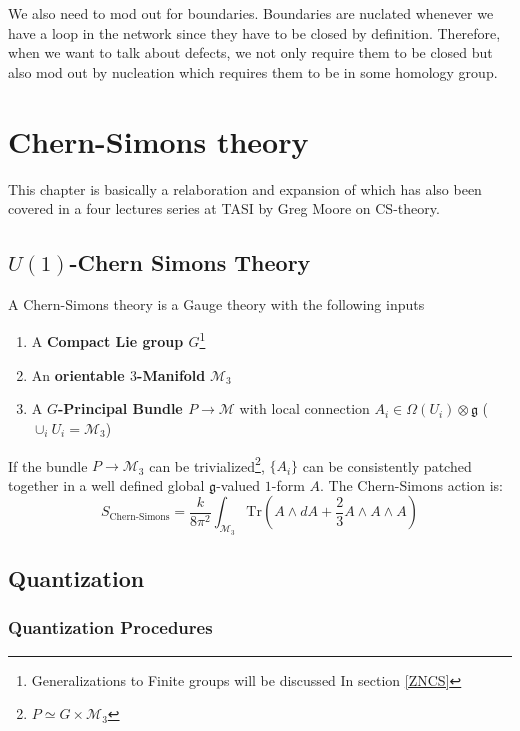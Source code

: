 \documentclass[11pt]{article}
\theoremstyle{definition}
\numberwithin{equation}{section}
\begin{document}
We also need to mod out for boundaries. Boundaries are nuclated whenever we have a loop in the network since they have to be closed by definition. Therefore, when we want to talk about defects, we not only require them to be closed but also mod out by nucleation which requires them to be in some homology group.

\section{Chern-Simons theory}
This chapter is basically a relaboration and expansion of \cite[Chapter 2]{Moor} which has also been covered in a four lectures series at TASI by Greg Moore on CS-theory. 

\subsection{$U(1)$-Chern Simons Theory}
A Chern-Simons theory is a Gauge theory with the following inputs
\begin{enumerate}
    \item A \textbf{Compact Lie group $G$}\footnote{Generalizations to Finite groups will be discussed In section \ref{ZNCS}}
    \item An \textbf{orientable $3$-Manifold} $\mathcal{M}_3$
    \item A \textbf{$G$-Principal Bundle $P \to \mathcal{M}$} with local connection $A_i \in \Omega(U_i) \otimes \mathfrak{g}$ ($\cup_{i} U_i = \mathcal{M}_3$)
\end{enumerate}
If the bundle $P \to \mathcal{M}_3$ can be trivialized\footnote{$P \simeq G \times \mathcal{M}_3$}, $\{A_i\}$ can be consistently patched together in a well defined global $\mathfrak{g}$-valued $1$-form $A$. The Chern-Simons action is:
\begin{equation}
    S_{\text{Chern-Simons}} = \frac{k}{8 \pi^2} \int_{\mathcal{M}_3} \text{Tr}(A \wedge d A + \frac{2}{3} A \wedge A \wedge A)
\end{equation}

\subsection{Quantization}
\subsubsection{Quantization Procedures}
\end{document}
